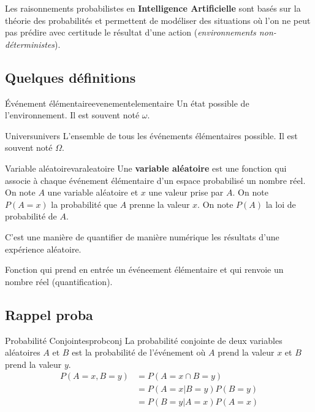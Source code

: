 Les raisonnements probabilistes en \textbf{Intelligence Artificielle} sont basés sur la théorie 
des probabilités et permettent de modéliser des situations 
où l'on ne peut pas prédire avec certitude le résultat d'une action (\textit{environnements non-déterministes}).

\subsection{Quelques définitions} %
\label{sub:quelques_definitions}


\begin{definition}{Événement élémentaire}{evenementelementaire}
    Un état possible de l'environnement. 
    Il est souvent noté $\omega$.
\end{definition}

\begin{definition}{Univers}{univers}
    L'ensemble de tous les événements élémentaires possible.
    Il est souvent noté $\Omega$.
\end{definition}

\begin{definition}{Variable aléatoire}{varaleatoire}
    Une \textbf{variable aléatoire} est une fonction qui associe à chaque événement élémentaire 
    d'un espace probabilisé un nombre réel. 
    On note $A$ une variable aléatoire et $x$ une valeur prise par $A$. 
    On note $P(A=x)$ la probabilité que $A$ prenne la valeur $x$. 
    On note $P(A)$ la loi de probabilité de $A$. 
\end{definition}

\begin{remark}\leavevmode
    C'est une manière de quantifier de manière numérique les résultats d'une expérience aléatoire.

    Fonction qui prend en entrée un événeement élémentaire et qui renvoie un nombre réel (quantification).
\end{remark}


\subsection{Rappel proba} %
\label{sub:rappel_proba}

\begin{definition}{Probabilité Conjointes}{probconj}
    La probabilité conjointe de deux variables aléatoires $A$ et $B$ est la probabilité de l'événement 
    où $A$ prend la valeur $x$ et $B$ prend la valeur $y$.
    \begin{align}
        P(A=x , B=y) &= P(A=x \cap B=y) \\ 
                    &= P(A=x | B=y)P(B=y) \\ 
                    &= P(B=y | A=x)P(A=x)
    \end{align}
\end{definition}

